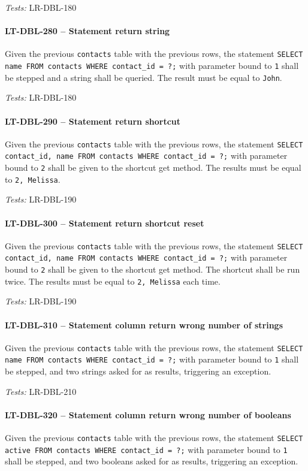\textit{Tests: } LR-DBL-180

\paragraph{LT-DBL-280 -- Statement return string}
Given the previous \lstinline{contacts} table with the previous rows,
the statement
\lstinline{SELECT name FROM contacts WHERE contact_id = ?;}
with parameter bound to \lstinline{1} shall be stepped and
a string shall be queried. The result must be equal to \lstinline{John}.

\textit{Tests: } LR-DBL-180

\paragraph{LT-DBL-290 -- Statement return shortcut}
Given the previous \lstinline{contacts} table with the previous rows,
the statement
\lstinline{SELECT contact_id, name FROM contacts WHERE contact_id = ?;}
with parameter bound to \lstinline{2} shall be given to the
shortcut get method. The results must be equal to \lstinline{2, Melissa}.

\textit{Tests: } LR-DBL-190

\paragraph{LT-DBL-300 -- Statement return shortcut reset}
Given the previous \lstinline{contacts} table with the previous rows,
the statement
\lstinline{SELECT contact_id, name FROM contacts WHERE contact_id = ?;}
with parameter bound to \lstinline{2} shall be given to the
shortcut get method. The shortcut shall be run twice.
The results must be equal to \lstinline{2, Melissa} each time.

\textit{Tests: } LR-DBL-190

\paragraph{LT-DBL-310 -- Statement column return wrong number of strings}
Given the previous \lstinline{contacts} table with the previous rows,
the statement
\lstinline{SELECT name FROM contacts WHERE contact_id = ?;}
with parameter bound to \lstinline{1} shall be stepped,
and two strings asked for as results, triggering an exception.

\textit{Tests: } LR-DBL-210

\paragraph{LT-DBL-320 -- Statement column return wrong number of booleans}
Given the previous \lstinline{contacts} table with the previous rows,
the statement
\lstinline{SELECT active FROM contacts WHERE contact_id = ?;}
with parameter bound to \lstinline{1} shall be stepped,
and two booleans asked for as results, triggering an exception.

